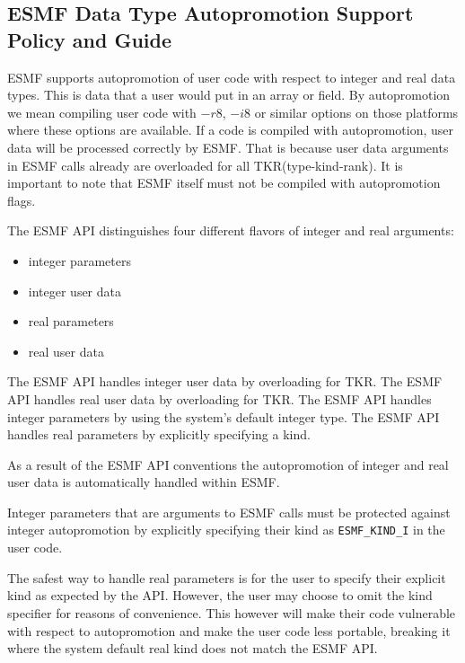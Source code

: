 
\subsection{ESMF Data Type Autopromotion Support Policy and Guide}

ESMF supports autopromotion of user code with respect to integer and real data types. This is data that a user would put in an array or field. By autopromotion we mean compiling user code with $-r8$, $-i8$ or similar options on those platforms where these options are available. If a code is compiled with autopromotion, user data will be processed correctly by ESMF. That is because user data arguments in ESMF calls already are overloaded for all TKR(type-kind-rank). It is important to note that ESMF itself must not be compiled with autopromotion flags.

The ESMF API distinguishes four different flavors of integer and real arguments:
\begin{itemize}
\item integer parameters
\item integer user data
\item real parameters
\item real user data
\end{itemize}

The ESMF API handles integer user data by overloading for TKR. The ESMF API handles real user data by overloading for TKR. The ESMF API handles integer parameters by using the system's default integer type. The ESMF API handles real parameters by explicitly specifying a kind.

As a result of the ESMF API conventions the autopromotion of integer and real user data is automatically handled within ESMF.

Integer parameters that are arguments to ESMF calls must be protected against integer autopromotion by explicitly specifying their kind as {\tt ESMF\_KIND\_I} in the user code.

The safest way to handle real parameters is for the user to specify their explicit kind as expected by the API. However, the user may choose to omit the kind specifier for reasons of convenience. This however will make their code vulnerable with respect to autopromotion and make the user code less portable, breaking it where the system default real kind does not match the ESMF API.

